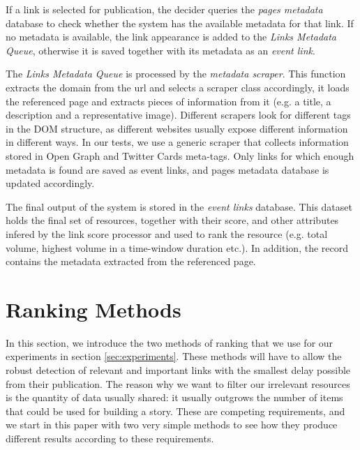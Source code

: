 \documentclass{sig-alternate}
\begin{document}
If a link is selected for publication, the decider queries the \emph{pages metadata} database to check whether the system has the available metadata for that link. If no metadata is available, the link appearance is added to the \emph{Links Metadata Queue}, otherwise it is saved together with its metadata as an \emph{event link}. 

The \emph{Links Metadata Queue} is processed by the \emph{metadata scraper}. This function extracts the domain from the url and selects a scraper class accordingly, it loads the referenced page and extracts pieces of information from it (e.g. a title, a description and a representative image). Different scrapers look for different tags in the DOM structure, as different websites usually expose different information in different ways. In our tests, we use a generic scraper that collects information stored in Open Graph and Twitter Cards meta-tags. Only links for which enough metadata is found are saved as event links, and pages metadata database is updated accordingly. %

The final output of the system is stored in the \emph{event links} database. This dataset holds the final set of resources, together with their score, and other attributes infered by the link score processor and used to rank the resource (e.g. total volume, highest volume in a time-window duration etc.). In addition, the record contains the metadata extracted from the referenced page. %

\section{Ranking Methods}
\label{sec:ranking_methods}
In this section, we introduce the two methods of ranking that we use for our experiments in section \ref{sec:experiments}. These methods will have to allow the robust detection of relevant and important links with the smallest delay possible from their publication. The reason why we want to filter our irrelevant resources is the quantity of data usually shared: it usually outgrows the number of items that could be used for building a story. These are competing requirements, and we start in this paper with two very simple methods to see how they produce different results according to these requirements.
\end{document}
